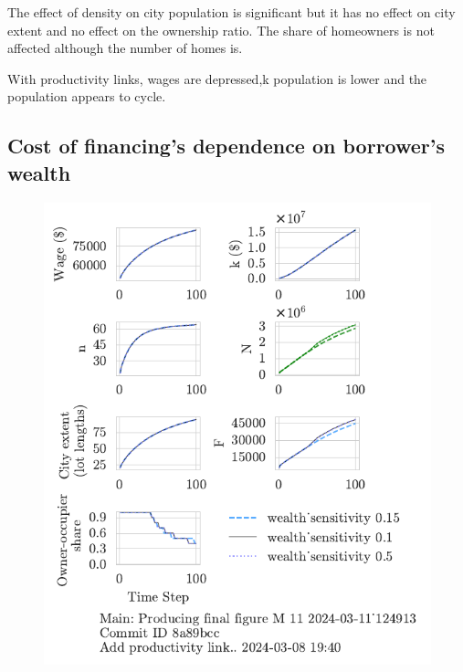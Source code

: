 The effect of density on city population is significant but it has no effect on city extent and no effect on the ownership ratio. The share of homeowners is not affected although the number of homes is. 

With productivity links, wages are depressed,k population is lower and the population appears to cycle.

\newpage %
\subsection{Cost of financing's dependence on borrower's wealth}
\begin{figure}[h!tb] 
    \centering
    \includegraphics[scale=.75, trim={0 1.4cm 1.0cm 0},clip]{fig/wealth_sensitivity-124913.pdf} 

\end{figure}
